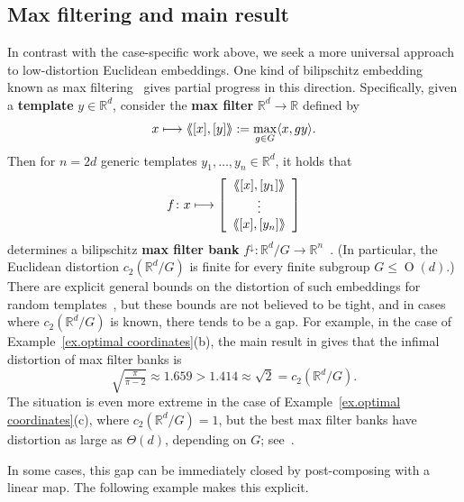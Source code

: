 \documentclass{article}
\theoremstyle{plain}
\theoremstyle{definition}
\newcommand{\llangle}{\langle\hspace{-2.5pt}\langle}
\newcommand{\rrangle}{\rangle\hspace{-2.5pt}\rangle}
\begin{document}
\subsection{Max filtering and main result}

In contrast with the case-specific work above, we seek a more universal approach to low-distortion Euclidean embeddings.
One kind of bilipschitz embedding known as max filtering~\cite{CahillIMP:25} gives partial progress in this direction.
Specifically, given a \textbf{template} $y\in\mathbb{R}^d$, consider the \textbf{max filter} $\mathbb{R}^d\to\mathbb{R}$ defined by
\[
x
\longmapsto\llangle [x],[y]\rrangle
:=\max_{g\in G}\langle x,gy\rangle.
\]
Then for $n=2d$ generic templates $y_1,\ldots,y_n\in\mathbb{R}^d$, it holds that
\[
f\colon x\longmapsto \left[\begin{array}{c}\llangle [x],[y_1]\rrangle\\\vdots\\ \llangle [x],[y_n]\rrangle\end{array}\right]
\]
determines a bilipschitz \textbf{max filter bank} $f^\downarrow\colon \mathbb{R}^d/G\to\mathbb{R}^n$~\cite{CahillIMP:25,BalanT:23}.
(In particular, the Euclidean distortion $c_2(\mathbb{R}^d/G)$ is finite for every finite subgroup $G \leq \operatorname{O}(d)$.)
There are explicit general bounds on the distortion of such embeddings for random templates~\cite{CahillIMP:25,MixonQ:25}, but these bounds are not believed to be tight, and in cases where $c_2(\mathbb{R}^d/G)$ is known, there tends to be a gap.
For example, in the case of Example~\ref{ex.optimal coordinates}(b), the main result in \cite{XiaXX:24} gives that the infimal distortion of max filter banks is 
\[
\sqrt{\tfrac{\pi}{\pi-2}}
\approx1.659
>1.414
\approx\sqrt{2}
=c_2(\mathbb{R}^d/G).
\]
The situation is even more extreme  in the case of Example~\ref{ex.optimal coordinates}(c), where $c_2(\mathbb{R}^d/G)=1$, but the best max filter banks have distortion as large as $\Theta(d)$, depending on $G$; see~\cite{MixonP:23}.

In some cases, this gap can be immediately closed by post-composing with a linear map.
The following example makes this explicit.
\end{document}
